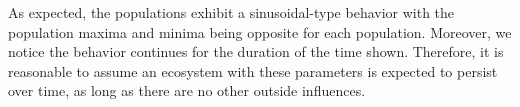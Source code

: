 \documentclass[a4paper,12pt]{article}
\begin{document}
As expected, the populations exhibit a sinusoidal-type behavior with the population maxima and minima being opposite for each population.  Moreover, we notice
the behavior continues for the duration of the time shown.  Therefore, it is reasonable to assume an ecosystem with these parameters is expected to persist
over time, as long as there are no other outside influences.










 


 
\end{document}
